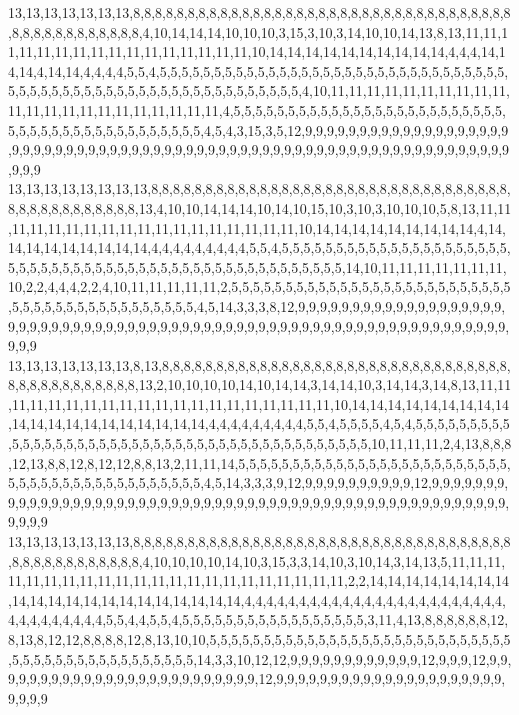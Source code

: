 13,13,13,13,13,13,13,8,8,8,8,8,8,8,8,8,8,8,8,8,8,8,8,8,8,8,8,8,8,8,8,8,8,8,8,8,8,8,8,8,8,8,8,8,8,8,8,8,8,8,8,8,8,8,4,10,14,14,14,10,10,10,3,15,3,10,3,14,10,10,14,13,8,13,11,11,11,11,11,11,11,11,11,11,11,11,11,11,11,11,10,14,14,14,14,14,14,14,14,14,14,4,4,4,14,14,14,4,14,14,4,4,4,4,5,5,4,5,5,5,5,5,5,5,5,5,5,5,5,5,5,5,5,5,5,5,5,5,5,5,5,5,5,5,5,5,5,5,5,5,5,5,5,5,5,5,5,5,5,5,5,5,5,5,5,5,5,5,5,5,5,5,5,5,5,5,4,10,11,11,11,11,11,11,11,11,11,11,11,11,11,11,11,11,11,11,11,11,11,11,4,5,5,5,5,5,5,5,5,5,5,5,5,5,5,5,5,5,5,5,5,5,5,5,5,5,5,5,5,5,5,5,5,5,5,5,5,5,5,5,5,5,5,5,4,5,4,3,15,3,5,12,9,9,9,9,9,9,9,9,9,9,9,9,9,9,9,9,9,9,9,9,9,9,9,9,9,9,9,9,9,9,9,9,9,9,9,9,9,9,9,9,9,9,9,9,9,9,9,9,9,9,9,9,9,9,9,9,9,9,9,9,9,9,9,9,9,9,9,9
13,13,13,13,13,13,13,13,8,8,8,8,8,8,8,8,8,8,8,8,8,8,8,8,8,8,8,8,8,8,8,8,8,8,8,8,8,8,8,8,8,8,8,8,8,8,8,8,8,8,8,8,8,13,4,10,10,14,14,14,10,14,10,15,10,3,10,3,10,10,10,5,8,13,11,11,11,11,11,11,11,11,11,11,11,11,11,11,11,11,11,11,10,14,14,14,14,14,14,14,14,14,4,14,14,14,14,14,14,14,14,14,4,4,4,4,4,4,4,4,4,5,5,4,5,5,5,5,5,5,5,5,5,5,5,5,5,5,5,5,5,5,5,5,5,5,5,5,5,5,5,5,5,5,5,5,5,5,5,5,5,5,5,5,5,5,5,5,5,5,5,5,5,5,5,5,14,10,11,11,11,11,11,11,11,10,2,2,4,4,4,2,2,4,10,11,11,11,11,11,2,5,5,5,5,5,5,5,5,5,5,5,5,5,5,5,5,5,5,5,5,5,5,5,5,5,5,5,5,5,5,5,5,5,5,5,5,5,5,5,5,5,5,5,4,5,14,3,3,3,8,12,9,9,9,9,9,9,9,9,9,9,9,9,9,9,9,9,9,9,9,9,9,9,9,9,9,9,9,9,9,9,9,9,9,9,9,9,9,9,9,9,9,9,9,9,9,9,9,9,9,9,9,9,9,9,9,9,9,9,9,9,9,9,9,9,9,9,9,9
13,13,13,13,13,13,13,8,13,8,8,8,8,8,8,8,8,8,8,8,8,8,8,8,8,8,8,8,8,8,8,8,8,8,8,8,8,8,8,8,8,8,8,8,8,8,8,8,8,8,8,8,8,13,2,10,10,10,10,14,10,14,14,3,14,14,10,3,14,14,3,14,8,13,11,11,11,11,11,11,11,11,11,11,11,11,11,11,11,11,11,11,11,11,10,14,14,14,14,14,14,14,14,14,14,14,14,14,14,14,14,14,14,14,14,4,4,4,4,4,4,4,4,4,5,5,4,5,5,5,5,4,5,4,5,5,5,5,5,5,5,5,5,5,5,5,5,5,5,5,5,5,5,5,5,5,5,5,5,5,5,5,5,5,5,5,5,5,5,5,5,5,5,5,5,5,10,11,11,11,2,4,13,8,8,8,12,13,8,8,12,8,12,12,8,8,13,2,11,11,14,5,5,5,5,5,5,5,5,5,5,5,5,5,5,5,5,5,5,5,5,5,5,5,5,5,5,5,5,5,5,5,5,5,5,5,5,5,5,5,5,5,5,5,4,5,14,3,3,3,9,12,9,9,9,9,9,9,9,9,9,9,12,9,9,9,9,9,9,9,9,9,9,9,9,9,9,9,9,9,9,9,9,9,9,9,9,9,9,9,9,9,9,9,9,9,9,9,9,9,9,9,9,9,9,9,9,9,9,9,9,9,9,9,9,9,9,9,9,9
13,13,13,13,13,13,13,8,8,8,8,8,8,8,8,8,8,8,8,8,8,8,8,8,8,8,8,8,8,8,8,8,8,8,8,8,8,8,8,8,8,8,8,8,8,8,8,8,8,8,8,8,8,8,4,10,10,10,10,14,10,3,15,3,3,14,10,3,10,14,3,14,13,5,11,11,11,11,11,11,11,11,11,11,11,11,11,11,11,11,11,11,11,11,11,11,2,2,14,14,14,14,14,14,14,14,14,14,14,14,14,14,14,14,14,14,14,14,14,4,4,4,4,4,4,4,4,4,4,4,4,4,4,4,4,4,4,4,4,4,4,4,4,4,4,4,4,4,4,4,4,4,5,5,4,4,5,5,4,5,5,5,5,5,5,5,5,5,5,5,5,5,5,5,5,5,3,11,4,13,8,8,8,8,8,8,12,8,13,8,12,12,8,8,8,8,12,8,13,10,10,5,5,5,5,5,5,5,5,5,5,5,5,5,5,5,5,5,5,5,5,5,5,5,5,5,5,5,5,5,5,5,5,5,5,5,5,5,5,5,5,5,5,5,5,5,14,3,3,10,12,12,9,9,9,9,9,9,9,9,9,9,9,9,12,9,9,9,12,9,9,9,9,9,9,9,9,9,9,9,9,9,9,9,9,9,9,9,9,9,9,9,9,9,12,9,9,9,9,9,9,9,9,9,9,9,9,9,9,9,9,9,9,9,9,9,9,9,9,9

